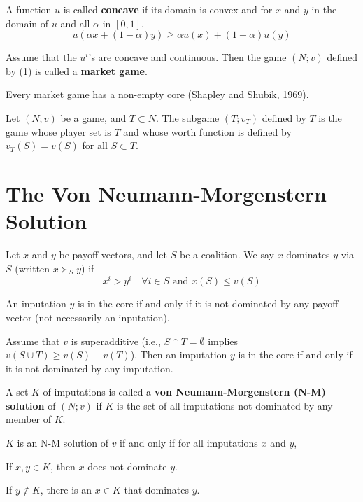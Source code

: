\documentclass[11pt,a4paper]{article}
\begin{document}
A function $u$ is called \textbf{concave} if its domain is convex and for $x$ and $y$ in the domain of $u$ and all $\alpha$ in $[0, 1]$,
\[
u(\alpha x + (1 - \alpha) y) \geqslant \alpha u(x) + (1 - \alpha) u(y)
\]

Assume that the $u^i$'s are concave and continuous. Then the game $(N; v)$ defined by (1) is called a \textbf{market game}. \par

Every market game has a non-empty core (Shapley and Shubik, 1969). \par

Let $(N;v)$ be a game, and $T \subset N$. The subgame $(T; v_T)$ defined by $T$ is the game whose player set is $T$ and whose worth function is defined by $v_T(S) = v(S)$ for all $S \subset T$. \par

\section{The Von Neumann-Morgenstern Solution}
Let $x$ and $y$ be payoff vectors, and let $S$ be a coalition. We say $x$ dominates $y$ via $S$ (written $x \succ_S y$) if
\[
x^i > y^i \quad \forall i \in S \text{ and } x(S) \leqslant v(S)
\]

An inputation $y$ is in the core if and only if it is not dominated by any payoff vector (not necessarily an inputation). \par

Assume that $v$ is superadditive (i.e., $S \cap T = \emptyset$ implies $v(S \cup T) \geqslant v(S) + v(T)$). Then an imputation $y$ is in the core if and only if it is not dominated by any imputation. \par

A set $K$ of imputations is called a \textbf{von Neumann-Morgenstern (N-M) solution} of $(N; v)$ if $K$ is the set of all imputations not dominated by any member of $K$. \par

$K$ is an N-M solution of $v$ if and only if for all imputations $x$ and $y$, \par
\quad If $x, y \in K$, then $x$ does not dominate $y$. \par
\quad If $y \notin K$, there is an $x \in K$ that dominates $y$.
\end{document}
